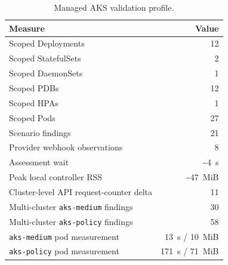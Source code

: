 \documentclass[10pt,journal]{IEEEtran}
\newcommand{\code}[1]{\texttt{#1}}
\begin{document}
\begin{table}[t]
  \centering
  \caption{Managed AKS validation profile.}
  \label{tab:aks-profile}
  \begin{tabular}{lr}
    \toprule
    Measure & Value \\
    \midrule
    Scoped Deployments & 12 \\
    Scoped StatefulSets & 2 \\
    Scoped DaemonSets & 1 \\
    Scoped PDBs & 12 \\
    Scoped HPAs & 1 \\
    Scoped Pods & 27 \\
    Scenario findings & 21 \\
    Provider webhook observations & 8 \\
    Assessment wait & \~{}4~s \\
    Peak local controller RSS & \~{}47~MiB \\
    Cluster-level API request-counter delta & 11 \\
    Multi-cluster \code{aks-medium} findings & 30 \\
    Multi-cluster \code{aks-policy} findings & 58 \\
    \code{aks-medium} pod measurement & 13~s / 10~MiB \\
    \code{aks-policy} pod measurement & 171~s / 71~MiB \\
    \bottomrule
  \end{tabular}
\end{table}
\end{document}
